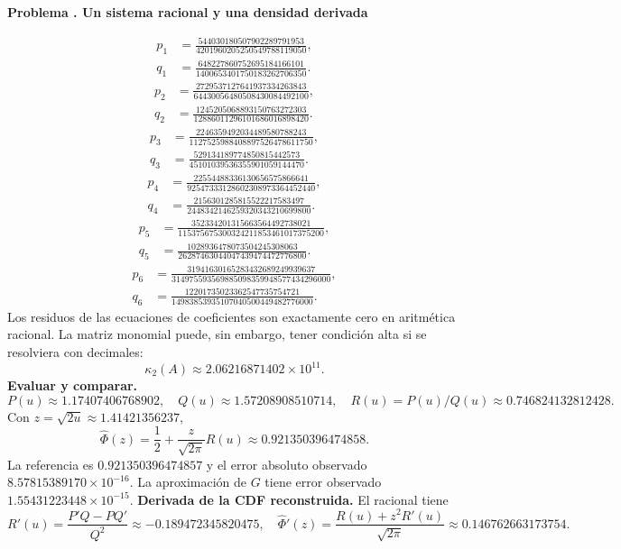 \documentclass[11pt,a4paper]{article}
\theoremstyle{definition}
\newcounter{problema}
\newenvironment{resuelto}[1]{\refstepcounter{problema}\par\medskip\Needspace{6\baselineskip}\textbf{Problema \theproblema. #1}\par}{\par\medskip}
\begin{document}
\begin{resuelto}{Un sistema racional y una densidad derivada}
\[
\begin{aligned}p_1&=\frac{544030180507902289791953}{4201960205250549788119050},\\q_1&=\frac{648227860752695184166101}{1400653401750183262706350}.\end{aligned}
\]
\[
\begin{aligned}p_2&=\frac{2729537127641937334263843}{64430056480508430084492100},\\q_2&=\frac{1245205068893150763272303}{12886011296101686016898420}.\end{aligned}
\]
\[
\begin{aligned}p_3&=\frac{2246359492034489580788243}{1127525988408897526478611750},\\q_3&=\frac{529134189774850815442573}{45101039536355901059144470}.\end{aligned}
\]
\[
\begin{aligned}p_4&=\frac{22554488336130656575866641}{92547333128602308973364452440},\\q_4&=\frac{2156301285815522217583497}{2448342146259320343210699800}.\end{aligned}
\]
\[
\begin{aligned}p_5&=\frac{352334201315663564492738021}{115375675300324211853461017375200},\\q_5&=\frac{1028936478073504245308063}{26287463044047439474472776800}.\end{aligned}
\]
\[
\begin{aligned}p_6&=\frac{31941630165283432689249939637}{314975593569885098359948577434296000},\\q_6&=\frac{12201735023362547735754721}{14983853935107040500449482776000}.\end{aligned}
\]
Los residuos de las ecuaciones de coeficientes son exactamente cero en aritmética racional. La matriz monomial puede, sin embargo, tener condición alta si se resolviera con decimales:
\[
\kappa_2(A)\approx2.06216871402\times10^{11}.
\]
\textbf{Evaluar y comparar.}
\[
P(u)\approx1.17407406768902,\quad Q(u)\approx1.57208908510714,\quad R(u)=P(u)/Q(u)\approx0.746824132812428.
\]
Con $z=\sqrt{2u}\approx1.41421356237$,
\[
\widehat\Phi(z)=\frac12+\frac z{\sqrt{2\pi}}R(u)\approx0.921350396474858.
\]
La referencia es $0.921350396474857$ y el error absoluto observado $8.57815389170\times10^{-16}$. La aproximación de $G$ tiene error observado $1.55431223448\times10^{-15}$.
\textbf{Derivada de la CDF reconstruida.} El racional tiene
\[
R\prime(u)=\frac{P\prime Q-PQ\prime}{Q^2}\approx-0.189472345820475,\quad
\widehat\Phi\prime(z)=\frac{R(u)+z^2R\prime(u)}{\sqrt{2\pi}}\approx0.146762663173754.
\]
\end{resuelto}
\end{document}
